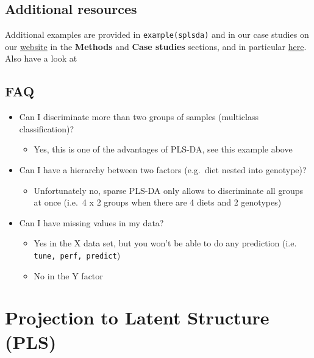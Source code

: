 \documentclass[]{book}
\providecommand{\tightlist}{%
  \setlength{\itemsep}{0pt}\setlength{\parskip}{0pt}}
\begin{document}
\hypertarget{additional-resources-1}{%
\section{Additional resources}\label{additional-resources-1}}

Additional examples are provided in \texttt{example(splsda)} and in our case studies on our \href{http://www.mixomics.org}{website} in the \textbf{Methods} and \textbf{Case studies} sections, and in particular \href{http://mixomics.org/case-studies/splsda-srbct/}{here}. Also have a look at \citep{Lec11}

\hypertarget{faq-1}{%
\section{FAQ}\label{faq-1}}

\begin{itemize}
\tightlist
\item
  Can I discriminate more than two groups of samples (multiclass classification)?

  \begin{itemize}
  \tightlist
  \item
    Yes, this is one of the advantages of PLS-DA, see this example above
  \end{itemize}
\item
  Can I have a hierarchy between two factors (e.g.~diet nested into genotype)?

  \begin{itemize}
  \tightlist
  \item
    Unfortunately no, sparse PLS-DA only allows to discriminate all groups at once (i.e.~4 x 2 groups when there are 4 diets and 2 genotypes)
  \end{itemize}
\item
  Can I have missing values in my data?

  \begin{itemize}
  \tightlist
  \item
    Yes in the X data set, but you won't be able to do any prediction (i.e. \texttt{tune,\ perf,\ predict})
  \item
    No in the Y factor
  \end{itemize}
\end{itemize}

\hypertarget{pls}{%
\chapter{Projection to Latent Structure (PLS)}\label{pls}}
\end{document}
